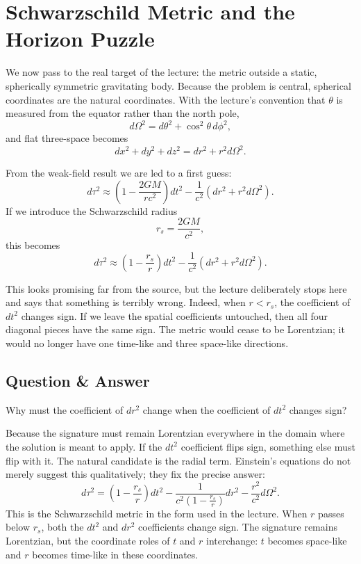 \section{Schwarzschild Metric and the Horizon Puzzle}

We now pass to the real target of the lecture: the metric outside a static, spherically symmetric gravitating body. Because the problem is central, spherical coordinates are the natural coordinates. With the lecture's convention that \(\theta\) is measured from the equator rather than the north pole,
\begin{equation}
d\Omega^2 = d\theta^2 + \cos^2\theta\,d\phi^2,
\end{equation}
and flat three-space becomes
\begin{equation}
dx^2+dy^2+dz^2 = dr^2 + r^2 d\Omega^2.
\end{equation}

From the weak-field result we are led to a first guess:
\begin{equation}
d\tau^2 \approx \left(1-\frac{2GM}{rc^2}\right)dt^2
- \frac{1}{c^2}\left(dr^2+r^2d\Omega^2\right).
\end{equation}
If we introduce the Schwarzschild radius
\begin{equation}
r_s=\frac{2GM}{c^2},
\end{equation}
this becomes
\begin{equation}
d\tau^2 \approx \left(1-\frac{r_s}{r}\right)dt^2
- \frac{1}{c^2}\left(dr^2+r^2d\Omega^2\right).
\end{equation}

This looks promising far from the source, but the lecture deliberately stops here and says that something is terribly wrong. Indeed, when \(r<r_s\), the coefficient of \(dt^2\) changes sign. If we leave the spatial coefficients untouched, then all four diagonal pieces have the same sign. The metric would cease to be Lorentzian; it would no longer have one time-like and three space-like directions.

\subsection{Question \& Answer}

Why must the coefficient of \(dr^2\) change when the coefficient of \(dt^2\) changes sign?

Because the signature must remain Lorentzian everywhere in the domain where the solution is meant to apply. If the \(dt^2\) coefficient flips sign, something else must flip with it. The natural candidate is the radial term. Einstein's equations do not merely suggest this qualitatively; they fix the precise answer:
\begin{equation}
d\tau^2
=
\left(1-\frac{r_s}{r}\right)dt^2
-\frac{1}{c^2\left(1-\frac{r_s}{r}\right)}dr^2
-\frac{r^2}{c^2}d\Omega^2.
\end{equation}
This is the Schwarzschild metric in the form used in the lecture. When \(r\) passes below \(r_s\), both the \(dt^2\) and \(dr^2\) coefficients change sign. The signature remains Lorentzian, but the coordinate roles of \(t\) and \(r\) interchange: \(t\) becomes space-like and \(r\) becomes time-like in these coordinates.

